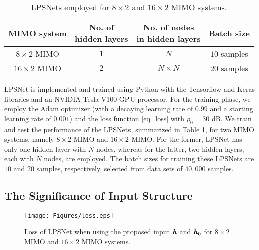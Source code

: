 \documentclass[conference]{IEEEtran}
\begin{document}
    \begin{table}[t!]
      \begin{center}
        \caption{LPSNets employed for $8 \times 2$ and $16 \times 2$ MIMO systems.}
        \label{tab_LPSNet_config}
        \begin{tabular}{|c|c|c|c|}
        \hline
          MIMO system & \makecell{No. of\\hidden layers} & \makecell{No. of nodes \\in hidden layers} & Batch size \\
          \hline
          \hline
          $8 \times 2$ MIMO & $1$ & $N$ & $10$ samples \\
          \hline
          $16 \times 2$ MIMO & $2$ & $N \times N$ & $20$ samples \\
          \hline
        \end{tabular}
      \end{center}
      \vspace{-6mm}
    \end{table}
    
	LPSNet is implemented and trained using Python with the Tensorflow and Keras libraries and an NVIDIA Tesla V100 GPU processor. For the training phase, we employ the Adam optimizer (with a decaying learning rate of $0.99$ and a starting learning rate of $0.001$) and the loss function \eqref{eq_loss} with $\rho_0 = 30$ dB. We train and test the performance of the LPSNets, summarized in Table \ref{tab_LPSNet_config}, for two MIMO systems, namely $8 \times 2$ MIMO and $16 \times 2$ MIMO. For the former, LPSNet has only one hidden layer with $N$ nodes, whereas for the latter, two hidden layers, each with $N$ nodes, are employed. The batch sizes for training these LPSNets are $10$ and $20$ samples,  respectively, selected from data sets of $40,$$000$ samples.
	
	\subsection{The Significance of Input Structure}
	\begin{figure}[t]
	\setlength{\belowcaptionskip}{-15pt}
		\texttt{[image: Figures/loss.eps]}
		\caption{Loss of LPSNet when using the proposed input $\bar{\textbf{\textit{h}}}$ and $\bar{\textbf{\textit{h}}}_0$ for $8 \times 2$ MIMO and $16 \times 2$ MIMO systems.}
		\label{fig_loss}
	\end{figure}
	
\end{document}

